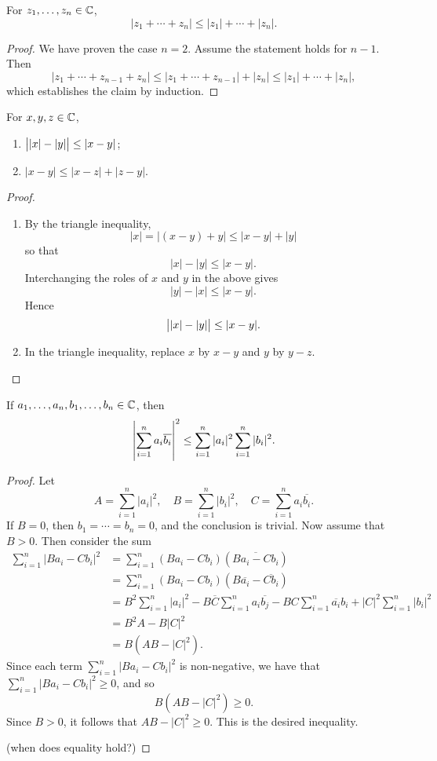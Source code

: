 \begin{corollary}
For $z_1,\dots,z_n\in\mathbb C$,
\[|z_1+\cdots+z_n|\le|z_1|+\cdots+|z_n|.\]
\end{corollary}

\begin{proof}
We have proven the case $n=2$. Assume the statement holds for $n-1$. Then
\[|z_1+\cdots+z_{n-1}+z_n|\le|z_1+\cdots+z_{n-1}|+|z_n|\le|z_1|+\cdots+|z_n|,\]
which establishes the claim by induction.
\end{proof}

\begin{corollary}
For $x,y,z\in\mathbb C$,
\begin{enumerate}[label=(\roman*)]
\item $\left||x|-|y|\right|\le|x-y|$;
\item $|x-y|\le|x-z|+|z-y|$.
\end{enumerate}
\end{corollary}

\begin{proof} \
\begin{enumerate}[label=(\roman*)]
\item By the triangle inequality,
\[|x|=|(x-y)+y|\le|x-y|+|y|\]
so that
\[|x|-|y|\le|x-y|.\]
Interchanging the roles of $x$ and $y$ in the above gives
\[|y|-|x|\le|x-y|.\]
Hence
\[\left||x|-|y|\right|\le|x-y|.\]
\item In the triangle inequality, replace $x$ by $x-y$ and $y$ by $y-z$.
\end{enumerate}
\end{proof}

\begin{theorem}
If $a_1,\dots,a_n,b_1,\dots,b_n\in\mathbb C$, then
\begin{equation}
\left|\sum_{i=1}^{n}a_i\overline{b_i}\right|^2\le\sum_{i=1}^{n}|a_i|^2\sum_{i=1}^{n}|b_i|^2.
\end{equation}
\end{theorem}

\begin{proof}
Let
\[A=\sum_{i=1}^{n}|a_i|^2,\quad B=\sum_{i=1}^{n}|b_i|^2,\quad C=\sum_{i=1}^{n}a_i\overline{b_i}.\]
If $B=0$, then $b_1=\cdots=b_n=0$, and the conclusion is trivial. Now assume that $B>0$. Then consider the sum
\begin{align*}
\sum_{i=1}^{n}|Ba_i-Cb_i|^2
&=\sum_{i=1}^{n}(Ba_i-Cb_i)(\overline{Ba_i-Cb_i})\\
&=\sum_{i=1}^{n}(Ba_i-Cb_i)(B\overline{a_i}-\overline{Cb_i})\\
&=B^2\sum_{i=1}^{n}|a_i|^2-B\overline{C}\sum_{i=1}^{n}a_i\overline{b_j}-BC\sum_{i=1}^{n}\overline{a_i}b_i+|C|^2\sum_{i=1}^{n}|b_i|^2\\
&=B^2A-B|C|^2\\
&=B(AB-|C|^2).
\end{align*}
Since each term $\displaystyle\sum_{i=1}^{n}|Ba_i-Cb_i|^2$ is non-negative, we have that $\displaystyle\sum_{i=1}^{n}|Ba_i-Cb_i|^2\ge0$, and so
\[B(AB-|C|^2)\ge0.\]
Since $B>0$, it follows that $AB-|C|^2\ge0$. This is the desired inequality.

(when does equality hold?)
\end{proof}

